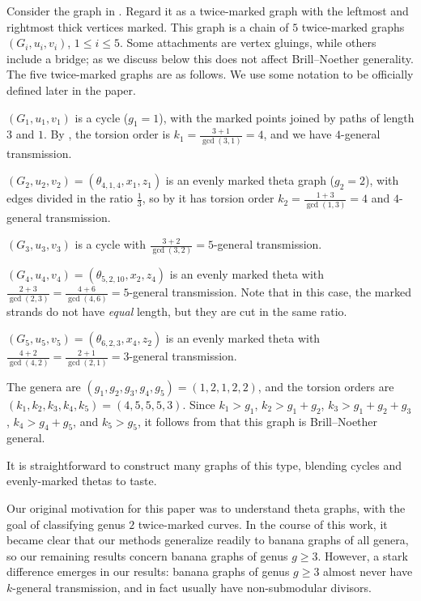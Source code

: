 \begin{example}
\label{eg:bng}
    Consider the graph in . Regard it as a twice-marked graph with the leftmost and rightmost thick vertices marked. This graph is a chain of $5$ twice-marked graphs $(G_i, u_i, v_i)$, $1 \leq i \leq 5$. Some attachments are vertex gluings, while others include a bridge; as we discuss below this does not affect Brill--Noether generality. The five twice-marked graphs are as follows. We use some notation to be officially defined later in the paper.
    
    $(G_1,u_1,v_1)$ is a cycle ($g_1 = 1$), with the marked points joined by paths of length $3$ and $1$. By , the torsion order is $k_1 = \frac{3+1}{\gcd(3,1)} = 4$, and we have $4$-general transmission.
    
    $(G_2,u_2,v_2) = (\theta_{4,1,4}, x_1, z_1)$ is an evenly marked theta graph ($g_2 = 2$), with edges divided in the ratio $\frac{1}{3}$, so by  it has torsion order $k_2 = \frac{1+3}{\gcd(1,3)} = 4$ and $4$-general transmission.
    
    $(G_3, u_3, v_3)$ is a cycle  with $\frac{3+2}{\gcd(3,2)} = 5$-general transmission.
    
    $(G_4,u_4,v_4) = (\theta_{5,2,10}, x_2, z_4)$ is an evenly marked theta with $\frac{2+3}{\gcd(2,3)} = \frac{4+6}{\gcd(4,6)} = 5$-general transmission. Note that in this case, the marked strands do not have \emph{equal} length, but they are cut in the same ratio.
    
    $(G_5, u_5, v_5) = (\theta_{6,2,3}, x_4, z_2)$ is an evenly marked theta with $\frac{4+2}{\gcd(4,2)} = \frac{2+1}{\gcd(2,1)} = 3$-general transmission.
    
    The genera are $(g_1, g_2, g_3,g_4,g_5) = (1,2,1,2,2)$, and the torsion orders are $(k_1, k_2, k_3, k_4, k_5) = (4,5,5,5,3)$. Since $k_1 > g_1$, $k_2 > g_1+g_2$, $k_3 > g_1+g_2+g_3$, $k_4 > g_4 + g_5$, and $k_5 > g_5$, it follows from  that this graph is Brill--Noether general.
    
    It is straightforward to construct many graphs of this type, blending cycles and evenly-marked thetas to taste.
\end{example}

Our original motivation for this paper was to understand theta graphs, with the goal of classifying genus $2$ twice-marked curves. In the course of this work, it became clear that our methods generalize readily to banana graphs of all genera, so our remaining results concern banana graphs of genus $g \geq 3$. However, a stark difference emerges in our results: banana graphs of genus $g \geq 3$ almost never have $k$-general transmission, and in fact usually have non-submodular divisors. 

